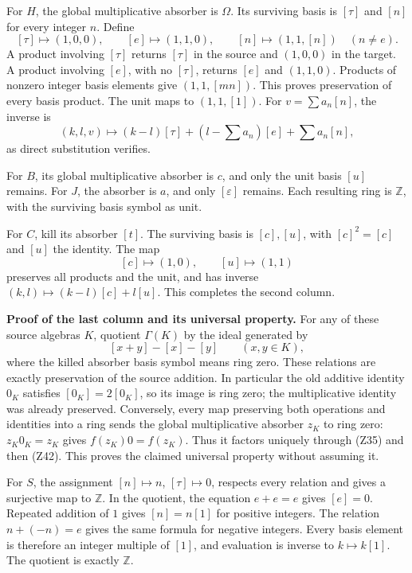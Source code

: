 \documentclass[
]{article}
\begin{document}
For \(H\), the global multiplicative absorber is \(\Omega\). Its
surviving basis is \([\tau]\) and \([n]\) for every integer \(n\).
Define \[
[\tau]\mapsto(1,0,0),\qquad
[e]\mapsto(1,1,0),\qquad
[n]\mapsto(1,1,[n])\quad(n\ne e).
\tag{Z39}
\] A product involving \([\tau]\) returns \([\tau]\) in the source and
\((1,0,0)\) in the target. A product involving \([e]\), with no
\([\tau]\), returns \([e]\) and \((1,1,0)\). Products of nonzero integer
basis elements give \((1,1,[mn])\). This proves preservation of every
basis product. The unit maps to \((1,1,[1])\). For \(v=\sum a_n[n]\),
the inverse is \[
(k,l,v)\mapsto
(k-l)[\tau]+\left(l-\sum a_n\right)[e]+\sum a_n[n],
\tag{Z40}
\] as direct substitution verifies.

For \(B\), its global multiplicative absorber is \(c\), and only the
unit basis \([u]\) remains. For \(J\), the absorber is \(a\), and only
\([\varepsilon]\) remains. Each resulting ring is \(\mathbb Z\), with
the surviving basis symbol as unit.

For \(C\), kill its absorber \([t]\). The surviving basis is
\([c],[u]\), with \([c]^2=[c]\) and \([u]\) the identity. The map \[
[c]\mapsto(1,0),\qquad[u]\mapsto(1,1)
\tag{Z41}
\] preserves all products and the unit, and has inverse
\((k,l)\mapsto(k-l)[c]+l[u]\). This completes the second column.

\textbf{Proof of the last column and its universal property.} For any of
these source algebras \(K\), quotient \(\Gamma(K)\) by the ideal
generated by \[
[x+y]-[x]-[y]\qquad(x,y\in K),
\tag{Z42}
\] where the killed absorber basis symbol means ring zero. These
relations are exactly preservation of the source addition. In particular
the old additive identity \(0_K\) satisfies \([0_K]=2[0_K]\), so its
image is ring zero; the multiplicative identity was already preserved.
Conversely, every map preserving both operations and identities into a
ring sends the global multiplicative absorber \(z_K\) to ring zero:
\(z_K0_K=z_K\) gives \(f(z_K)0=f(z_K)\). Thus it factors uniquely
through (Z35) and then (Z42). This proves the claimed universal property
without assuming it.

For \(S\), the assignment \([n]\mapsto n\), \([\tau]\mapsto0\), respects
every relation and gives a surjective map to \(\mathbb Z\). In the
quotient, the equation \(e+e=e\) gives \([e]=0\). Repeated addition of
\(1\) gives \([n]=n[1]\) for positive integers. The relation
\(n+(-n)=e\) gives the same formula for negative integers. Every basis
element is therefore an integer multiple of \([1]\), and evaluation is
inverse to \(k\mapsto k[1]\). The quotient is exactly \(\mathbb Z\).
\end{document}
